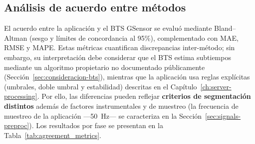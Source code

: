 \documentclass[12pt]{report}
\begin{document}
\begin{justify}
    \section{Análisis de acuerdo entre métodos}
    \label{sec:acuerdo}

    El acuerdo entre la aplicación y el BTS GSensor se evaluó mediante Bland--Altman (sesgo y límites de concordancia al 95\%), complementado con MAE, RMSE y MAPE. Estas métricas cuantifican discrepancias inter-método; sin embargo, su interpretación debe considerar que el BTS estima subtiempos mediante un algoritmo propietario no documentado públicamente (Sección~\ref{sec:consideracion-bts}), mientras que la aplicación usa reglas explícitas (umbrales, doble umbral y estabilidad) descritas en el Capítulo~\ref{ch:server-processing}. Por ello, las diferencias pueden reflejar \textbf{criterios de segmentación distintos} además de factores instrumentales y de muestreo (la frecuencia de muestreo de la aplicación —50~Hz— se caracteriza en la Sección~\ref{sec:signals-preproc}). Los resultados por fase se presentan en la Tabla~\ref{tab:agreement_metrics}.\\


\end{justify}
\end{document}
